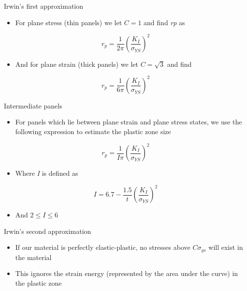 \documentclass[
  letterpaper,
  ignorenonframetext,
  aspectratio=43,
  handout,
  12pt]{beamer}
\providecommand{\tightlist}{%
  \setlength{\itemsep}{0pt}\setlength{\parskip}{0pt}}
\providecommand{\tightlist}{%
\setlength{\itemsep}{0pt}\setlength{\parskip}{0pt}}
\begin{document}
\begin{frame}{Irwin's first approximation}
\protect\hypertarget{irwins-first-approximation-3}{}
\begin{itemize}
\tightlist
\item
  For plane stress (thin panels) we let \(C=1\) and find
  \emph{r}\emph{p} as
\end{itemize}

\[r_p = \frac{1}{2\pi} \left(\frac{K_I}{\sigma_{YS}}\right)^2\]

\begin{itemize}
\tightlist
\item
  And for plane strain (thick panels) we let \(C=\sqrt{3}\) and find
\end{itemize}

\[r_p = \frac{1}{6\pi} \left(\frac{K_I}{\sigma_{YS}}\right)^2\]
\end{frame}

\begin{frame}{Intermediate panels}
\protect\hypertarget{intermediate-panels}{}
\begin{itemize}
\tightlist
\item
  For panels which lie between plane strain and plane stress states, we
  use the following expression to estimate the plastic zone size
\end{itemize}

\[r_p = \frac{1}{I\pi} \left(\frac{K_I}{\sigma_{YS}}\right)^2\]

\begin{itemize}
\tightlist
\item
  Where \emph{I} is defined as
\end{itemize}

\[I = 6.7 - \frac{1.5}{t}\left(\frac{K_I}{\sigma_{YS}}\right)^2\]

\begin{itemize}
\tightlist
\item
  And \(2 \le I \le 6\)
\end{itemize}
\end{frame}

\begin{frame}{Irwin's second approximation}
\protect\hypertarget{irwins-second-approximation}{}
\begin{itemize}
\tightlist
\item
  If our material is perfectly elastic-plastic, no stresses above
  \(C\sigma_{ys}\) will exist in the material
\item
  This ignores the strain energy (represented by the area under the
  curve) in the plastic zone
\end{itemize}
\end{frame}
\end{document}
